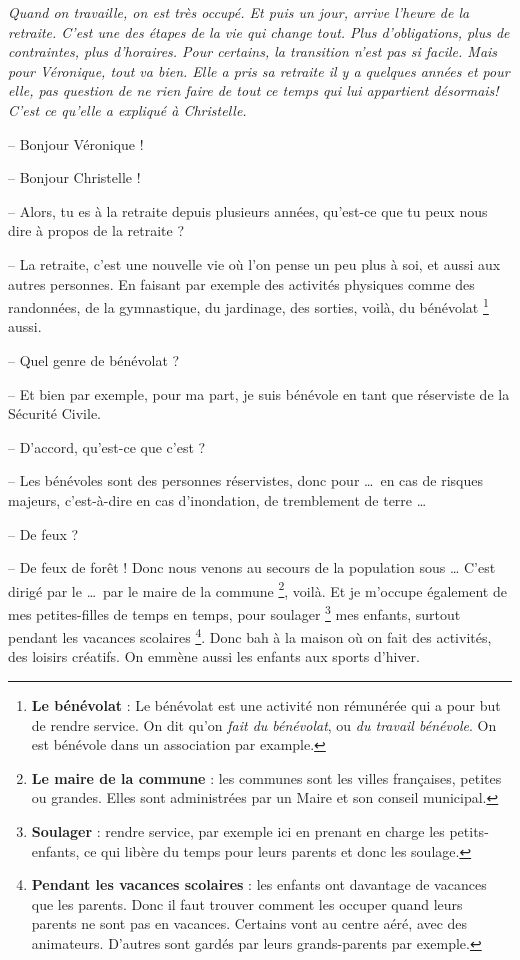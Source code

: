 \documentclass[11pt, french]{report}
\begin{document}
\textit{Quand on travaille, on est très occupé. Et puis un jour, arrive
  l’heure de la retraite. C’est une des étapes de la vie qui change tout.
  Plus d’obligations, plus de contraintes, plus d’horaires. Pour certains,
  la transition n’est pas si facile. Mais pour Véronique, tout va bien. Elle
  a pris sa retraite il y a quelques années et pour elle, pas question de
  ne rien faire de tout ce temps qui lui appartient désormais! C’est ce
  qu’elle a expliqué à Christelle.}

\vfill

-- Bonjour Véronique !

-- Bonjour Christelle !

-- Alors, tu es à la retraite depuis plusieurs années, qu'est-ce que tu peux
nous dire à propos de la retraite ?

-- La retraite, c'est une nouvelle vie où l'on pense un peu plus à soi, et
aussi aux autres personnes. En faisant par exemple des activités physiques
comme des randonnées, de la gymnastique, du jardinage, des sorties, voilà,
du bénévolat \footnote{\textbf{Le bénévolat} : Le bénévolat est une activité
  non rémunérée qui a pour but de rendre service. On dit qu'on
  \textit{fait du bénévolat}, ou \textit{du travail bénévole}. On est
  bénévole dans un association par example.} aussi.

-- Quel genre de bénévolat ?

-- Et bien par exemple, pour ma part, je suis bénévole en tant que réserviste
de la Sécurité Civile.

-- D'accord, qu'est-ce que c'est ?

-- Les bénévoles sont des personnes réservistes, donc pour \ldots\ en cas de
risques majeurs, c'est-à-dire en cas d'inondation, de tremblement de
terre \ldots\ 

-- De feux ?

-- De feux de forêt ! Donc nous venons au secours de la population sous \ldots
C'est dirigé par le \ldots\ par le maire de la commune
\footnote{\textbf{Le maire de la commune} : les communes sont les villes
  françaises, petites ou grandes. Elles sont administrées par un Maire et
  son conseil municipal.}, voilà. Et je m'occupe également de mes
petites-filles de temps en temps, pour soulager
\footnote{\textbf{Soulager} : rendre service, par exemple ici en prenant en
  charge les petits-enfants, ce qui libère du temps pour leurs parents et
  donc les soulage.} mes enfants, surtout pendant les vacances scolaires
\footnote{\textbf{Pendant les vacances scolaires} : les enfants ont
  davantage de vacances que les parents. Donc il faut trouver comment les
  occuper quand leurs parents ne sont pas en vacances. Certains vont au
  centre aéré, avec des animateurs. D'autres sont gardés par leurs
  grands-parents par exemple.}. Donc bah à la maison où on fait des
activités, des loisirs créatifs. On emmène aussi les enfants aux sports
d'hiver.
\end{document}
